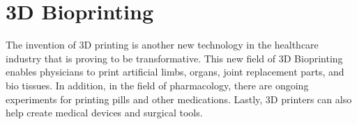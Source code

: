 \documentclass[12pt]{article}
\begin{document}
\section*{3D Bioprinting}

The invention of 3D printing is another new technology in the healthcare industry that is proving to be transformative. This new field of 3D Bioprinting enables physicians to print artificial limbs, organs, joint replacement parts, and bio tissues. In addition, in the field of pharmacology, there are ongoing experiments for printing pills and other medications. Lastly, 3D printers can also help create medical devices and surgical tools.
\end{document}

